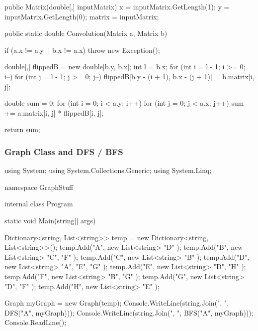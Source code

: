 \begin{flushleft}
\begin{cscode}
{{        public Matrix(double[,] inputMatrix)
        {
            x = inputMatrix.GetLength(1);
            y = inputMatrix.GetLength(0);
            matrix = inputMatrix;
        }

        public static double Convolution(Matrix a, Matrix b)
        {
            if (a.x != a.y || b.x != a.x) throw new Exception();

            double[,] flippedB = new double[b.y, b.x];
            int l = b.x;
            for (int i = l - 1; i >= 0; i--)
            {
                for (int j = l - 1; j >= 0; j--)
                {
                    flippedB[b.y - (i + 1), b.x - (j + 1)] = b.matrix[i, j];
                }
            }


            double sum = 0;
            for (int i = 0; i < a.y; i++)
            {
                for (int j = 0; j < a.x; j++)
                {
                    sum += a.matrix[i, j] * flippedB[i, j];
                }
            }

            return sum;
        }
    }
}
    \end{cscode}
    \subsubsection{Graph Class and DFS / BFS}
    \begin{cscode}
using System;
using System.Collections.Generic;
using System.Linq;

namespace GraphStuff
{
    internal class Program
    {
        static void Main(string[] args)
        {
            Dictionary<string, List<string>> temp = new Dictionary<string, List<string>>();
            temp.Add("A", new List<string>
            {
                "D"
            });
            temp.Add("B", new List<string>
            {
                "C", "F"
            });
            temp.Add("C", new List<string>
            {
                "B"
            });
            temp.Add("D", new List<string>
            {
                "A", "E", "G"
            });
            temp.Add("E", new List<string>
            {
                "D", "H"
            });
            temp.Add("F", new List<string>
            {
                "B", "G"
            });
            temp.Add("G", new List<string>
            {
                "D", "F"
            });
            temp.Add("H", new List<string>
            {
                "E"
            });

            Graph myGraph = new Graph(temp);
            Console.WriteLine(string.Join(", ", DFS("A", myGraph)));
            Console.WriteLine(string.Join(", ", BFS("A", myGraph)));
            Console.ReadLine();
        }

}}
\end{cscode}
\end{flushleft}
